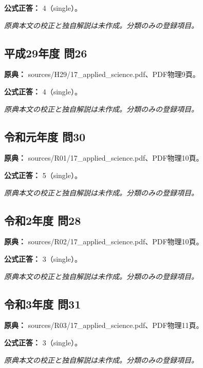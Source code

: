 \textbf{公式正答：} 4（single）。

\par\textit{原典本文の校正と独自解説は未作成。分類のみの登録項目。}

\subsection{平成29年度 問26}
\label{q:h29-reg-applied-26}

\noindent\textbf{原典：} sources/H29/17\_applied\_science.pdf、PDF物理9頁。

\textbf{公式正答：} 4（single）。

\par\textit{原典本文の校正と独自解説は未作成。分類のみの登録項目。}

\subsection{令和元年度 問30}
\label{q:r01-reg-applied-30}

\noindent\textbf{原典：} sources/R01/17\_applied\_science.pdf、PDF物理10頁。

\textbf{公式正答：} 5（single）。

\par\textit{原典本文の校正と独自解説は未作成。分類のみの登録項目。}

\subsection{令和2年度 問28}
\label{q:r02-reg-applied-28}

\noindent\textbf{原典：} sources/R02/17\_applied\_science.pdf、PDF物理10頁。

\textbf{公式正答：} 3（single）。

\par\textit{原典本文の校正と独自解説は未作成。分類のみの登録項目。}

\subsection{令和3年度 問31}
\label{q:r03-reg-applied-31}

\noindent\textbf{原典：} sources/R03/17\_applied\_science.pdf、PDF物理11頁。

\textbf{公式正答：} 3（single）。

\par\textit{原典本文の校正と独自解説は未作成。分類のみの登録項目。}

